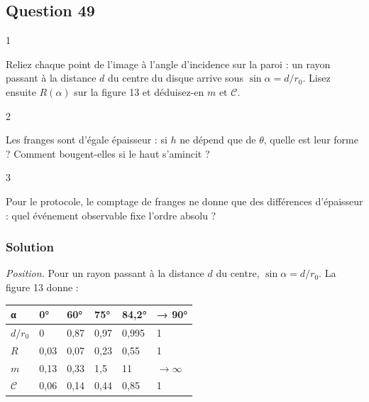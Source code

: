\documentclass[11pt,a4paper]{article}
\begin{document}
\hypertarget{question-49}{%
\subsection{Question 49}\label{question-49}}

\begin{indication}{1}

Reliez chaque point de l'image à l'angle d'incidence sur la paroi : un rayon passant à la distance \(d\) du centre du disque arrive sous \(\sin\alpha=d/r_0\). Lisez ensuite \(R(\alpha)\) sur la figure 13 et déduisez-en \(m\) et \(\mathcal C\).

\end{indication}

\begin{indication}{2}

Les franges sont d'égale épaisseur : si \(h\) ne dépend que de \(\theta\), quelle est leur forme ? Comment bougent-elles si le haut s'amincit ?

\end{indication}

\begin{indication}{3}

Pour le protocole, le comptage de franges ne donne que des différences d'épaisseur : quel événement observable fixe l'ordre absolu ?

\end{indication}

\hypertarget{solution-48}{%
\subsubsection{Solution}\label{solution-48}}

\emph{Position.} Pour un rayon passant à la distance \(d\) du centre, \(\sin\alpha=d/r_0\). La figure 13 donne :

\begin{longtable}[]{@{}llllll@{}}
\toprule\noalign{}
α & 0° & 60° & 75° & 84,2° & → 90° \\
\midrule\noalign{}
\endhead
\bottomrule\noalign{}
\endlastfoot
\(d/r_0\) & 0 & 0,87 & 0,97 & 0,995 & 1 \\
\(R\) & 0,03 & 0,07 & 0,23 & 0,55 & 1 \\
\(m\) & 0,13 & 0,33 & 1,5 & 11 & \(\to\infty\) \\
\(\mathcal C\) & 0,06 & 0,14 & 0,44 & 0,85 & 1 \\
\end{longtable}
\end{document}

